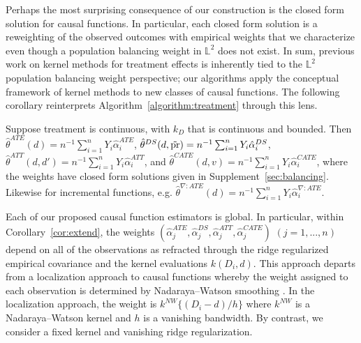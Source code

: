 Perhaps the most surprising consequence of our construction is the closed form solution for causal functions. In particular, each closed form solution is a reweighting of the observed outcomes with empirical weights that we characterize even though a population balancing weight in $\mathbb{L}^2$ does not exist. 
In sum, previous work \cite{kallus2020generalized,hirshberg2019minimax,singh2021debiased} on kernel methods for treatment effects is inherently tied to the $\mathbb{L}^2$ population balancing weight perspective; our algorithms apply the conceptual framework of kernel methods to new classes of causal functions. The following corollary reinterprets Algorithm~\ref{algorithm:treatment} through this lens. 

\begin{corollary}\label{cor:extend}
Suppose treatment is continuous, with $k_{D}$ that is continuous and bounded. Then 
$\hat{\theta}^{ATE}(d)=n^{-1}\sum_{i=1}^n Y_i\hat{\alpha}_i^{ATE}$,
$\hat{\theta}^{DS}(d,\tilde{\text{\normalfont pr}})=n^{-1}\sum_{i=1}^{n}Y_i\hat{\alpha}_i^{DS}$,  $\hat{\theta}^{ATT}(d,d')=n^{-1}\sum_{i=1}^n Y_i\hat{\alpha}_i^{ATT}$, and  
$\hat{\theta}^{CATE}(d,v)=n^{-1}\sum_{i=1}^n Y_i\hat{\alpha}_i^{CATE} $, where the weights have closed form solutions given in Supplement~\ref{sec:balancing}. Likewise for incremental functions, e.g. $\hat{\theta}^{\nabla:ATE}(d)=n^{-1}\sum_{i=1}^n Y_i\hat{\alpha}_i^{\nabla:ATE}$.
\end{corollary}


Each of our proposed causal function estimators is global. In particular, within Corollary~\ref{cor:extend}, the weights $(\hat{\alpha}_j^{ATE},\hat{\alpha}_j^{DS},\hat{\alpha}_j^{ATT},\hat{\alpha}_j^{CATE})$ $(j=1,...,n)$ depend on all of the observations as refracted through the ridge regularized empirical covariance and the kernel evaluations $k(D_i,d)$. This approach departs from a localization approach to causal functions whereby the weight assigned to each observation is determined by Nadaraya--Watson smoothing \cite{kennedy2017nonparametric,kallus2018policy,colangelo2020double,chernozhukov2022debiased}. In the localization approach, the weight is $k^{NW}\{(D_i-d)/h\}$ where $k^{NW}$ is a Nadaraya--Watson kernel and $h$ is a vanishing bandwidth. By contrast, we consider a fixed kernel and vanishing ridge regularization.

